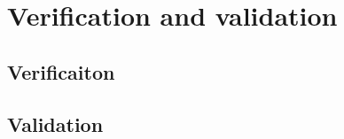 \section{Verification and validation} %
\label{sec:verification_and_validation}
\subsection{Verificaiton} %
\label{sub:verificaiton}

\subsection{Validation} %
\label{sub:validation}

